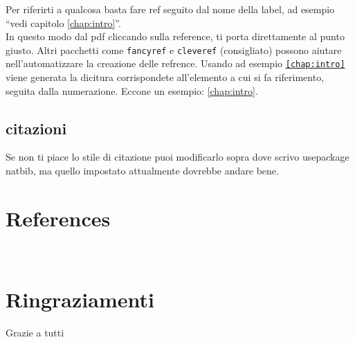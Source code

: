 \documentclass[12pt,a4paper,twoside]{book}
\begin{document}
Per riferirti a qualcosa basta fare ref seguito dal nome della label, ad esempio ``vedi capitolo \ref{chap:intro}''.\\In questo modo dal pdf cliccando sulla reference, ti porta direttamente al punto giusto.
Altri pacchetti come \texttt{fancyref} e \texttt{cleveref} (consigliato) possono aiutare nell'automatizzare la creazione delle refrence. Usando ad esempio \texttt{\cref{chap:intro}} viene generata la dicitura corrispondete all'elemento a cui si fa riferimento, seguita dalla numerazione. Eccone un esempio: \cref{chap:intro}.
\section{citazioni}

Se non ti piace lo stile di citazione puoi modificarlo sopra dove scrivo usepackage natbib, ma quello impostato attualmente dovrebbe andare bene.



\renewcommand{\bibsection}{}
\chapter*{References}

\newpage

\renewcommand{\appendixtocname}{Appendices}
{}

\newpage~\newpage
\chapter*{Ringraziamenti}
Grazie a tutti
\end{document}
